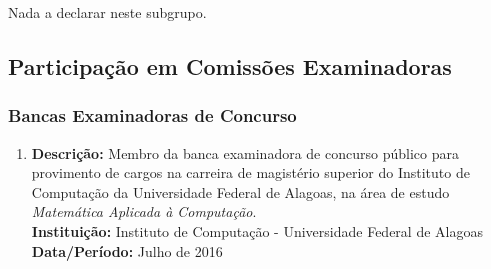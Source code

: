 \documentclass[a4paper,oneside,10pt]{article}
\begin{document}
Nada a declarar neste subgrupo.
%
%

\subsection{Participa\c{c}\~{a}o em Comiss\~{o}es Examinadoras}
\vspace{0.3cm}

\subsubsection{Bancas Examinadoras de Concurso}
\vspace{0.3cm}

\begin{enumerate}
\renewcommand{\labelenumi}{{\large\bfseries\arabic{enumi}.}}
\vspace{0.3cm}

\item       \textbf{Descrição:} Membro da banca examinadora de concurso público para provimento de cargos na carreira de magistério superior do Instituto de Computação da Universidade Federal de Alagoas, na área de estudo \emph{Matemática Aplicada à Computação}. \mbox{}\\%
            \textbf{Instituição:} Instituto de Computação - Universidade Federal de Alagoas\\
            \textbf{Data/Período:} Julho de 2016 %

\end{enumerate}
\end{document}
